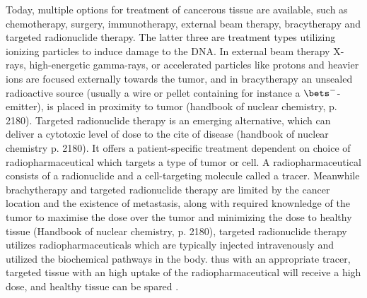 \documentclass[a4paper,11pt,twoside]{book}
\begin{document}
Today, multiple options for treatment of cancerous tissue are available, such as chemotherapy, surgery, immunotherapy, external beam therapy, bracytherapy and targeted radionuclide therapy. The latter three are treatment types utilizing ionizing particles to induce damage to the DNA. In external beam therapy X-rays, high-energetic gamma-rays, or accelerated particles like protons and heavier ions are focused externally towards the tumor, and in bracytherapy an unsealed radioactive source (usually a wire or pellet containing for instance a $\bets^-$-emitter), is placed in proximity to tumor (handbook of nuclear chemistry, p. 2180). Targeted radionuclide therapy is an emerging alternative, which can deliver a cytotoxic level of dose to the cite of disease (handbook of nuclear chemistry p. 2180). It offers a patient-specific treatment dependent on choice of radiopharmaceutical which targets a type of tumor or cell. A radiopharmaceutical consists of a radionuclide and a cell-targeting molecule called a tracer. Meanwhile brachytherapy and targeted radionuclide therapy are limited by the cancer location and the existence of metastasis, along with required knownledge of the tumor to maximise the dose over the tumor and minimizing the dose to healthy tissue (Handbook of nuclear chemistry, p. 2180), targeted radionuclide therapy utilizes radiopharmaceuticals which are typically injected intravenously and utilized the biochemical pathways in the body. thus with an appropriate tracer, targeted tissue with an high uptake of the radiopharmaceutical will receive a high dose, and healthy tissue can be spared \cite{Yeong2014a}.\\ 
\end{document}
